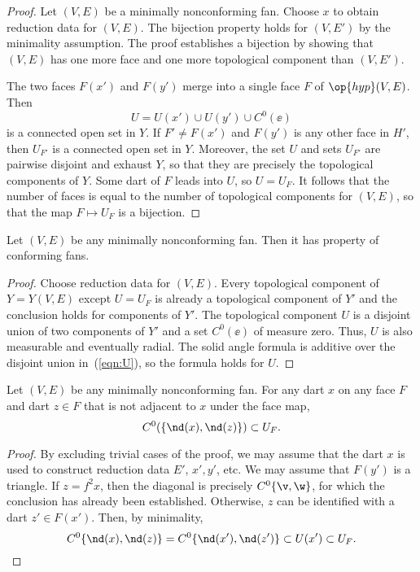 \begin{proof} Let $(V,E)$ be a minimally nonconforming fan.  Choose
  $x$ to obtain reduction data for $(V,E)$.  The bijection property
  holds for $(V,E')$ by the minimality assumption.  The proof 
  establishes a bijection by showing that $(V,E)$ has one more face and
  one more topological component than $(V,E')$.

The
two faces $F(x')$ and $F(y')$ merge into a single face $F$ of
$\op{hyp}(V,E)$.  Then
\begin{equation}\label{eqn:U}
U= U(x')\cup U(y')\cup C^0(\ee)
\end{equation} 
is a connected open set in $Y$.  If $F'\ne F(x')$ and $F(y')$ is any other
face in $H'$, then $U_{F'}$ is a connected open set in $Y$.  Moreover,
the set $U$ and sets $U_{F'}$ are pairwise disjoint and exhaust $Y$,
so that they are precisely the topological components of $Y$.  Some
dart of $F$ leads into $U$, so $U=U_F$. 
It follows that the number of
faces is equal to the number of topological components for $(V,E)$, so that the
map $F\mapsto U_F$ is a bijection.
\end{proof}


\begin{lemma}[]\cutrate{} Let $(V,E)$ be any minimally
nonconforming fan.  Then it has property  of
conforming fans.
\end{lemma}

\begin{proof} Choose reduction data for $(V,E)$.  Every topological
component of $Y=Y(V,E)$ except $U=U_F$ is already a topological
component of $Y'$ and the conclusion holds for components of $Y'$.
The topological component $U$ is a disjoint union of two components
of $Y'$ and a set $C^0(\ee)$ of measure zero.  Thus, $U$ is also
measurable and eventually radial.  The solid angle formula is
additive over the disjoint union in~(\ref{eqn:U}), so the formula
holds for $U$.
\end{proof}
%


\begin{lemma}[]\cutrate{} Let $(V,E)$ be any minimally
nonconforming fan.  For any dart $x$ on any face $F$ and dart $z\in
F$ that is not adjacent to $x$ under the face map,
\[ 
C^0(\{\nd(x),\nd(z)\}) \subset U_F.
\] 
\end{lemma}

\begin{proof}  
  By excluding trivial cases of the proof, we may assume that the dart $x$ 
  is used to construct reduction data $E'$, $x',y'$, etc. We may
  assume that $F(y')$ is a triangle.  If $z=f^2x$, then the diagonal
  is precisely $C^0\{\v,\w\}$, for which the conclusion has already
  been established.  Otherwise, $z$ can be identified with a dart
  $z'\in F(x')$.  Then, by minimality,
\[ 
C^0\{\nd(x),\nd(z)\} = C^0\{\nd(x'),\nd(z')\} \subset U(x') \subset U_F.
\] 
\end{proof}

